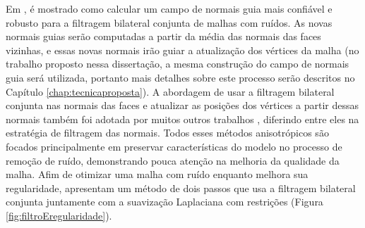 Em \cite{zhang2015guided}, é mostrado como calcular um campo de normais guia mais confiável e robusto para a filtragem bilateral conjunta de malhas com ruídos. As novas normais guias serão computadas a partir da média das normais das faces vizinhas, e essas novas normais irão guiar a atualização dos vértices da malha (no trabalho proposto nessa dissertação, a mesma construção do campo de normais guia será utilizada, portanto mais detalhes sobre este processo serão descritos no Capítulo \ref{chap:tecnicaproposta}). A abordagem de usar a filtragem bilateral conjunta nas normais das faces e atualizar as posições dos vértices a partir dessas normais também foi adotada por muitos outros trabalhos \cite{sun2007fast, yagou2002mesh, chen2005sharpness, sun2008random}, diferindo entre eles na estratégia de filtragem das normais. Todos esses métodos anisotrópicos são focados principalmente em preservar características do modelo no processo de remoção de ruído, demonstrando pouca atenção na melhoria da qualidade da malha. Afim de otimizar uma malha com ruído enquanto melhora sua regularidade, \cite{wei2013feature} apresentam um método de dois passos que usa a filtragem bilateral conjunta juntamente com a suavização Laplaciana com restrições (Figura \ref{fig:filtroEregularidade}). 

